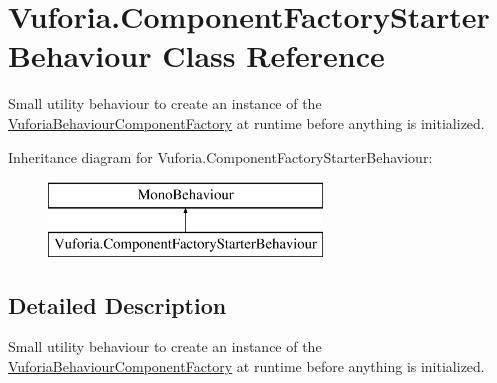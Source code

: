 \hypertarget{class_vuforia_1_1_component_factory_starter_behaviour}{}\section{Vuforia.\+Component\+Factory\+Starter\+Behaviour Class Reference}
\label{class_vuforia_1_1_component_factory_starter_behaviour}


Small utility behaviour to create an instance of the \hyperlink{class_vuforia_1_1_vuforia_behaviour_component_factory}{Vuforia\+Behaviour\+Component\+Factory} at runtime before anything is initialized.  


Inheritance diagram for Vuforia.\+Component\+Factory\+Starter\+Behaviour\+:\begin{figure}[H]
\begin{center}
\leavevmode
\includegraphics[height=2.000000cm]{class_vuforia_1_1_component_factory_starter_behaviour}
\end{center}
\end{figure}


\subsection{Detailed Description}
Small utility behaviour to create an instance of the \hyperlink{class_vuforia_1_1_vuforia_behaviour_component_factory}{Vuforia\+Behaviour\+Component\+Factory} at runtime before anything is initialized. 

